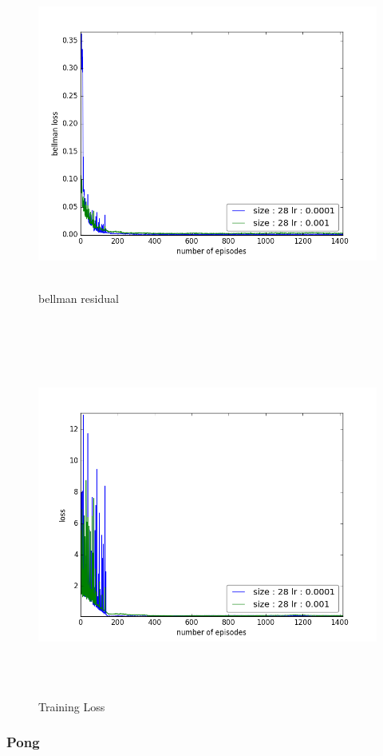 \documentclass{report}
\begin{document}
\begin{figure}[H]
    \begin{minipage}[c]{.49\linewidth}
        \centering
        \includegraphics[width = \linewidth]{plots/b3/MsPacman-v3/bellmanLossArray.png}
        \caption{bellman residual}
    \end{minipage}
    \hfill%
    \begin{minipage}[c]{.49\linewidth}
        \centering
        \includegraphics[width = \linewidth]{plots/b3/MsPacman-v3/lossArray.png}
        \caption{Training Loss}
    \end{minipage}
\end{figure}

\subsubsection*{Pong}
\end{document}
